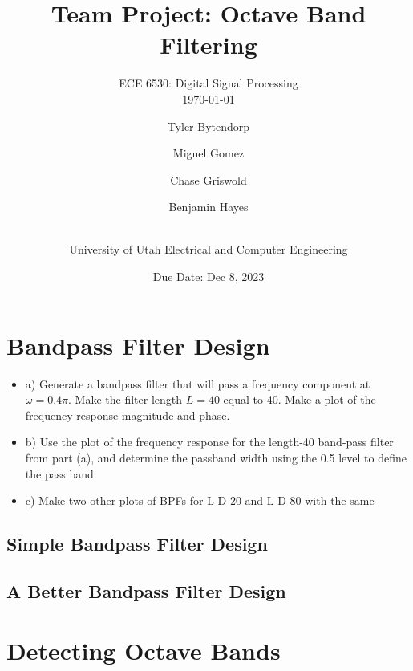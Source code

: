 \documentclass[a4paper, 11pt]{exam}
\title{Team Project: Octave Band Filtering}
\subtitle{ECE 6530: Digital Signal Processing \\
\today\\}
\author{ Tyler Bytendorp \and Miguel Gomez \and Chase Griswold \and Benjamin Hayes \and\\
University of Utah Electrical and Computer Engineering}
\date{Due Date: Dec 8, 2023}
\begin{document}
\maketitle
\noindent
\setcounter{section}{3}
\section{Bandpass Filter Design}
\begin{itemize}
  \item a) Generate a bandpass filter that will pass a frequency component at $\omega = 0.4 \pi$. Make the filter length $L = 40$ equal to 40. Make a plot of the frequency response magnitude and phase. \\ 
  \item b) Use the plot of the frequency response for the length-40 band-pass filter from part (a), and determine the passband width using the 0.5 level to define the pass band. \\ 
  \item c)  Make two other plots of BPFs for L D 20 and L D 80 with the same \\
\end{itemize}
\subsection{Simple Bandpass Filter Design}
\subsection{A Better Bandpass Filter Design}
\section{Detecting Octave Bands}
\end{document}
